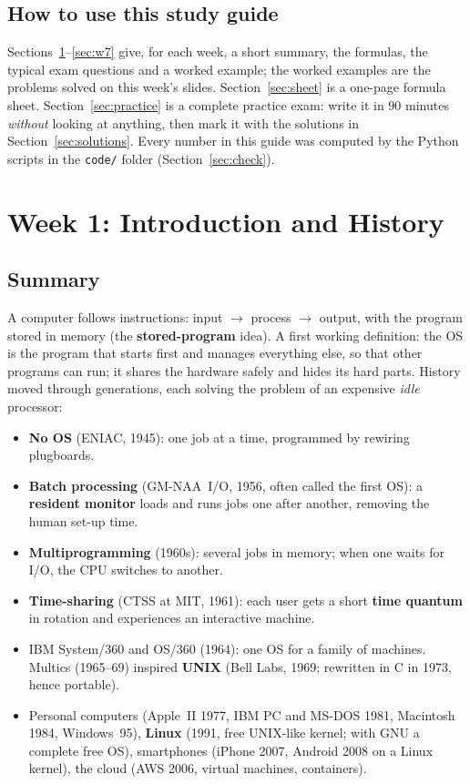 \documentclass[11pt,a4paper]{article}
\newcommand{\term}[1]{\textbf{\color{mintdeep}#1}}
\begin{document}
\subsection{How to use this study guide}
Sections~\ref{sec:w1}--\ref{sec:w7} give, for each week, a short summary, the formulas, the typical exam questions and a worked example; the worked examples are the problems solved on this week's slides. Section~\ref{sec:sheet} is a one-page formula sheet. Section~\ref{sec:practice} is a complete practice exam: write it in $90$ minutes \emph{without} looking at anything, then mark it with the solutions in Section~\ref{sec:solutions}. Every number in this guide was computed by the Python scripts in the \texttt{code/} folder (Section~\ref{sec:check}).

\section{Week 1: Introduction and History}
\label{sec:w1}
\subsection*{Summary}
A computer follows instructions: input $\to$ process $\to$ output, with the program stored in memory (the \term{stored-program} idea). A first working definition: the OS is the program that starts first and manages everything else, so that other programs can run; it shares the hardware safely and hides its hard parts. History moved through generations, each solving the problem of an expensive \emph{idle} processor:
\begin{itemize}
  \item \textbf{No OS} (ENIAC, 1945): one job at a time, programmed by rewiring plugboards.
  \item \textbf{Batch processing} (GM-NAA~I/O, 1956, often called the first OS): a \term{resident monitor} loads and runs jobs one after another, removing the human set-up time.
  \item \textbf{Multiprogramming} (1960s): several jobs in memory; when one waits for I/O, the CPU switches to another.
  \item \textbf{Time-sharing} (CTSS at MIT, 1961): each user gets a short \term{time quantum} in rotation and experiences an interactive machine.
  \item IBM System/360 and OS/360 (1964): one OS for a family of machines. Multics (1965--69) inspired \textbf{UNIX} (Bell Labs, 1969; rewritten in C in 1973, hence portable).
  \item Personal computers (Apple~II 1977, IBM PC and MS-DOS 1981, Macintosh 1984, Windows~95), \textbf{Linux} (1991, free UNIX-like kernel; with GNU a complete free OS), smartphones (iPhone 2007, Android 2008 on a Linux kernel), the cloud (AWS 2006, virtual machines, containers).
\end{itemize}
\end{document}
